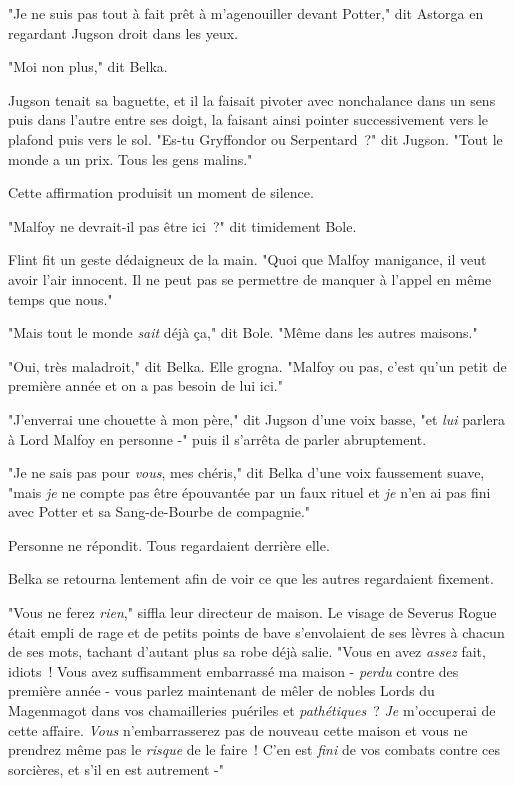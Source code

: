 "Je ne suis pas tout à fait prêt à m'agenouiller devant Potter," dit Astorga en regardant Jugson droit dans les yeux.

"Moi non plus," dit Belka.

Jugson tenait sa baguette, et il la faisait pivoter avec nonchalance dans un sens puis dans l'autre entre ses doigt, la faisant ainsi pointer successivement vers le plafond puis vers le sol. "Es-tu Gryffondor ou Serpentard~?" dit Jugson. "Tout le monde a un prix. Tous les gens malins."

Cette affirmation produisit un moment de silence.

"Malfoy ne devrait-il pas être ici~?" dit timidement Bole.

Flint fit un geste dédaigneux de la main. "Quoi que Malfoy manigance, il veut avoir l'air innocent. Il ne peut pas se permettre de manquer à l'appel en même temps que nous."

"Mais tout le monde \emph{sait} déjà ça," dit Bole. "Même dans les autres maisons."

"Oui, très maladroit," dit Belka. Elle grogna. "Malfoy ou pas, c'est qu'un petit de première année et on a pas besoin de lui ici."

"J'enverrai une chouette à mon père," dit Jugson d'une voix basse, "et \emph{lui} parlera à Lord Malfoy en personne -" puis il s'arrêta de parler abruptement.

"Je ne sais pas pour \emph{vous}, mes chéris," dit Belka d'une voix faussement suave, "mais \emph{je} ne compte pas être épouvantée par un faux rituel et \emph{je} n'en ai pas fini avec Potter et sa Sang-de-Bourbe de compagnie."

Personne ne répondit. Tous regardaient derrière elle.

Belka se retourna lentement afin de voir ce que les autres regardaient fixement.

"Vous ne ferez \emph{rien}," siffla leur directeur de maison. Le visage de Severus Rogue était empli de rage et de petits points de bave s'envolaient de ses lèvres à chacun de ses mots, tachant d'autant plus sa robe déjà salie. "Vous en avez \emph{assez} fait, idiots~! Vous avez suffisamment embarrassé ma maison - \emph{perdu} contre des première année - vous parlez maintenant de mêler de nobles Lords du Magenmagot dans vos chamailleries puériles et \emph{pathétiques}~? \emph{Je} m'occuperai de cette affaire. \emph{Vous} n'embarrasserez pas de nouveau cette maison et vous ne prendrez même pas le \emph{risque} de le faire~! C'en est \emph{fini} de vos combats contre ces sorcières, et s'il en est autrement -"


